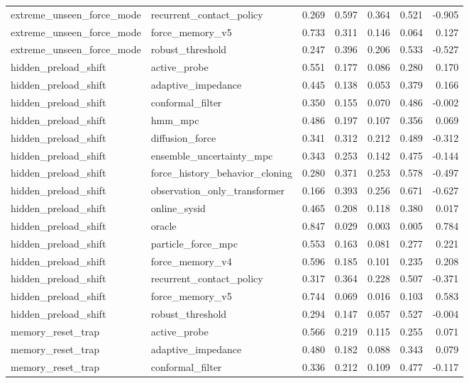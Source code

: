 \documentclass{article}
\begin{document}
\begin{longtable}{llrrrrr}
extreme\_unseen\_force\_mode & recurrent\_contact\_policy & 0.269 & 0.597 & 0.364 & 0.521 & -0.905 \\
extreme\_unseen\_force\_mode & force\_memory\_v5 & 0.733 & 0.311 & 0.146 & 0.064 & 0.127 \\
extreme\_unseen\_force\_mode & robust\_threshold & 0.247 & 0.396 & 0.206 & 0.533 & -0.527 \\
hidden\_preload\_shift & active\_probe & 0.551 & 0.177 & 0.086 & 0.280 & 0.170 \\
hidden\_preload\_shift & adaptive\_impedance & 0.445 & 0.138 & 0.053 & 0.379 & 0.166 \\
hidden\_preload\_shift & conformal\_filter & 0.350 & 0.155 & 0.070 & 0.486 & -0.002 \\
hidden\_preload\_shift & hmm\_mpc & 0.486 & 0.197 & 0.107 & 0.356 & 0.069 \\
hidden\_preload\_shift & diffusion\_force & 0.341 & 0.312 & 0.212 & 0.489 & -0.312 \\
hidden\_preload\_shift & ensemble\_uncertainty\_mpc & 0.343 & 0.253 & 0.142 & 0.475 & -0.144 \\
hidden\_preload\_shift & force\_history\_behavior\_cloning & 0.280 & 0.371 & 0.253 & 0.578 & -0.497 \\
hidden\_preload\_shift & observation\_only\_transformer & 0.166 & 0.393 & 0.256 & 0.671 & -0.627 \\
hidden\_preload\_shift & online\_sysid & 0.465 & 0.208 & 0.118 & 0.380 & 0.017 \\
hidden\_preload\_shift & oracle & 0.847 & 0.029 & 0.003 & 0.005 & 0.784 \\
hidden\_preload\_shift & particle\_force\_mpc & 0.553 & 0.163 & 0.081 & 0.277 & 0.221 \\
hidden\_preload\_shift & force\_memory\_v4 & 0.596 & 0.185 & 0.101 & 0.235 & 0.208 \\
hidden\_preload\_shift & recurrent\_contact\_policy & 0.317 & 0.364 & 0.228 & 0.507 & -0.371 \\
hidden\_preload\_shift & force\_memory\_v5 & 0.744 & 0.069 & 0.016 & 0.103 & 0.583 \\
hidden\_preload\_shift & robust\_threshold & 0.294 & 0.147 & 0.057 & 0.527 & -0.004 \\
memory\_reset\_trap & active\_probe & 0.566 & 0.219 & 0.115 & 0.255 & 0.071 \\
memory\_reset\_trap & adaptive\_impedance & 0.480 & 0.182 & 0.088 & 0.343 & 0.079 \\
memory\_reset\_trap & conformal\_filter & 0.336 & 0.212 & 0.109 & 0.477 & -0.117 \\

\end{longtable}
\end{document}
